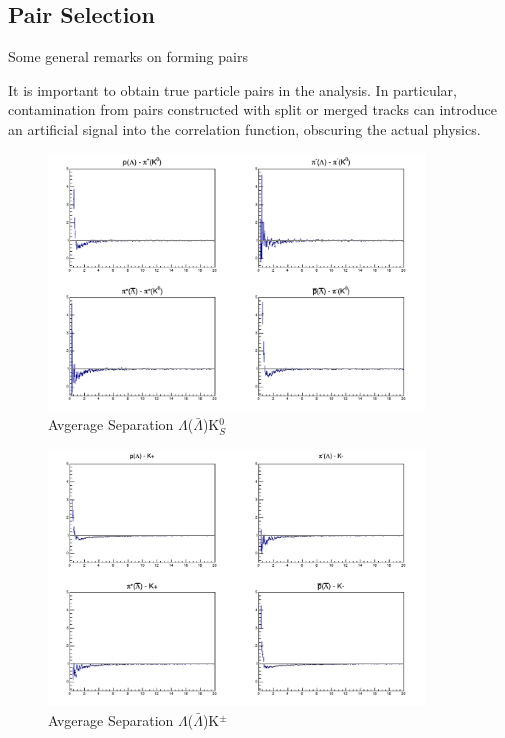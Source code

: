 \documentclass[../AnalysisNoteJBuxton.tex]{subfiles}
\begin{document}
\subsection{Pair Selection}
\label{PairSelection}

Some general remarks on forming pairs

It is important to obtain true particle pairs in the analysis.  In particular, contamination from pairs constructed with split or merged tracks can introduce an artificial signal into the correlation function, obscuring the actual physics.

\begin{figure}[h]
  \centering
  \includegraphics[width=100mm]{3_DataSelection/Figures/AvgSepCFs_LamK0.pdf}
  \caption[Avgerage Separation $\Lambda$($\bar{\Lambda}$)K$^{0}_{S}$]{Avgerage Separation $\Lambda$($\bar{\Lambda}$)K$^{0}_{S}$}
  \label{fig:AvgSepLamK0}
\end{figure}

\begin{figure}[h]
  \centering
  \includegraphics[width=100mm]{3_DataSelection/Figures/AvgSepCFs_LamKch.pdf}
  \caption[Avgerage Separation $\Lambda$($\bar{\Lambda}$)K$^{\pm}$]{Avgerage Separation $\Lambda$($\bar{\Lambda}$)K$^{\pm}$}
  \label{fig:AvgSepLamKch}
\end{figure}
\end{document}
